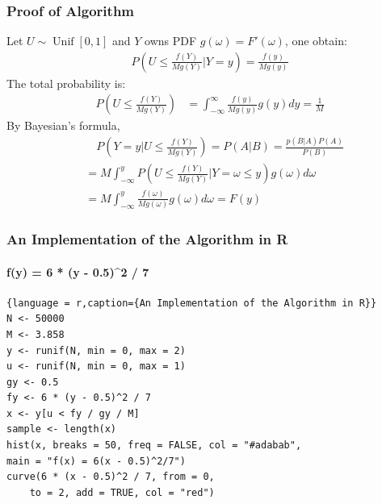 \begin{frame}
    \frametitle{Proof of Algorithm}
    Let \(U \sim \operatorname{Unif}[0,1]\) and \(Y\) owns PDF \(g(\omega) = F'(\omega)\), one obtain:
    \begin{align*}
        P\left(U \leq \frac{f(Y)}{Mg(Y)}\bigg |Y = y  \right) = \frac{f(y)}{Mg(y)}
    \end{align*}
    The total probability is:
    \begin{align*}
        P\left(U \leq \frac{f(Y)}{Mg(Y)} \right) &= \int _{-\infty}^\infty\frac{f(y)}{Mg(y)}g(y) dy = \frac 1 M
    \end{align*}
    By Bayesian's formula,
    \begin{align*}
        &\quad P\left(Y = y \bigg | U \leq \frac{f(Y)}{Mg(Y)}  \right)= P(A|B) = \frac{p(B|A)P(A)}{P(B)}\\
        &= M\int_{-\infty}^ y  P\left(U \leq \frac{f(Y)}{Mg(Y)}\bigg |Y = \omega \leq y  \right)g(\omega) d \omega\\
        &= M\int_{-\infty}^ y   \frac{f(\omega)}{Mg(\omega)} g(\omega) d\omega = F(y)
    \end{align*}

    

\end{frame}


\begin{frame}[fragile]
    \frametitle{{An Implementation of the Algorithm in R}}
    \framesubtitle<overlay specification>{f(y) = 6 * (y - 0.5)^2 / 7}
        \begin{lstlisting}{language = r,caption={An Implementation of the Algorithm in R}}
N <- 50000
M <- 3.858
y <- runif(N, min = 0, max = 2)
u <- runif(N, min = 0, max = 1)
gy <- 0.5
fy <- 6 * (y - 0.5)^2 / 7
x <- y[u < fy / gy / M]
sample <- length(x)
hist(x, breaks = 50, freq = FALSE, col = "#adabab",
main = "f(x) = 6(x - 0.5)^2/7")
curve(6 * (x - 0.5)^2 / 7, from = 0, 
    to = 2, add = TRUE, col = "red")
    \end{lstlisting}


\end{frame}

